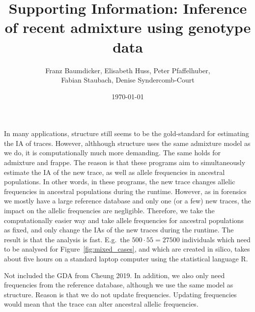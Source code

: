 \documentclass[12pt]{article}
\theoremstyle{definition}
\begin{document}
In many applications, {\sc structure} still seems to be the
gold-standard for estimating the IA of traces. However, althhough {\sc
  structure} uses the same admixture model as we do, it is
computationally much more demanding. The same holds for {\sc
  admixture} and {\sc frappe}. The reason is that these programs aim
to simultaneously estimate the IA of the new trace, as well as allele
frequencies in ancestral populations. In other words, in these
programs, the new trace changes allelic frequencies in ancestral
populations during the runtime. However, as in forensics we mostly
have a large reference database and only one (or a few) new traces,
the impact on the allelic frequencies are negligible. Therefore, we
take the computationally easier way and take allele frequencies for
ancestral populations as fixed, and only change the IAs of the new
traces during the runtime. The result is that the analysis is
fast. E.g.\ the $500\cdot 55 = 27500$ individuals which need to be
analysed for Figure~\ref{fig:mixed_cases}, and which are created in
silico, takes about five hours on a standard laptop computer using the
statistical language R.



Not included the GDA from Cheung 2019. In addition, we also only need
frequencies from the reference database, although we use the same
model as structure. Reason is that we do not update
frequencies. Updating frequencies would mean that the trace can alter
ancestral allelic frequencies.


 

\newpage
\setcounter{page}{1}
\setcounter{section}{0}
\thispagestyle{empty}

\begin{center}
 \title{\LARGE Supporting Information: Inference
  of recent admixture using genotype data}

~~

\author{\sc Franz Baumdicker, Elisabeth Huss, Peter Pfaffelhuber,\\
  \sc Fabian Staubach, Denise Syndercomb-Court}

~

\date{\today}

\maketitle
  
\end{center}
\end{document}
